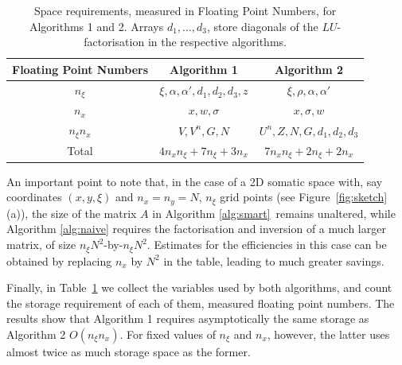 \documentclass[a4paper,final]{siamart190516}
\newcommand{\otoprule}{\midrule[\heavyrulewidth]}
\begin{document}
\begin{table}
  \centering
  \caption{Space requirements, measured in Floating Point Numbers, for
  Algorithms 1 and 2. Arrays $d_1, \ldots, d_3$, store diagonals of the
$LU$-factorisation in the respective algorithms.}
\label{tab:memory}
\begin{tabular}{ccc}
  \toprule
   Floating Point Numbers & Algorithm 1 & Algorithm 2 \\
  \otoprule
  $n_\xi$       & $\xi,\alpha,\alpha',d_1,d_2,d_3,z$ & $\xi, \rho, \alpha, \alpha'$ \\  
  $n_x$         & $x,w,\sigma$                       & $x, \sigma, w$ \\  
  $n_\xi n_x$   &  $V,V^n,G,N$                       & $U^n,Z,N,G,d_1,d_2,d_3$ \\  
  \midrule
  Total         & $4n_x n_\xi + 7n_\xi + 3n_x$      &  $ 7 n_x n_\xi +2n_\xi + 2n_x $  \\  
  \bottomrule
\end{tabular}
\end{table}

An important point to note that, in the case of a 2D somatic space with, say
coordinates $(x,y,\xi)$ and $n_x=n_y=N$, $n_\xi$ grid points (see
Figure~\ref{fig:sketch}(a)), the size of the matrix $A$ in
Algorithm \ref{alg:smart} remains unaltered, while Algorithm \ref{alg:naive}
requires the factorisation and inversion of a much larger matrix, of size $n_\xi N^2$-by-$n_\xi
N^2$. Estimates for the efficiencies in this case can be obtained by replacing $n_x$ by
$N^2$ in the table, leading to much greater savings.

Finally, in Table~\ref{tab:memory} we collect the variables used by both algorithms,
and count the storage requirement of each of them, measured floating point numbers.
The results show that Algorithm 1 requires asymptotically the same storage as
Algorithm 2 $O(n_\xi n_x)$. For fixed values of $n_\xi$ and $n_x$, however, the
latter uses almost twice as much storage space as the former.
\end{document}
